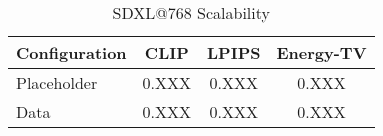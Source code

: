 
\begin{table}[H]
\centering
\caption{SDXL@768 Scalability}
\label{tab:table5_sdxl_scalability}
\begin{tabular}{lccc}
\toprule
Configuration & CLIP & LPIPS & Energy-TV \\
\midrule
Placeholder & 0.XXX & 0.XXX & 0.XXX \\
Data & 0.XXX & 0.XXX & 0.XXX \\
\bottomrule
\end{tabular}
\end{table}
